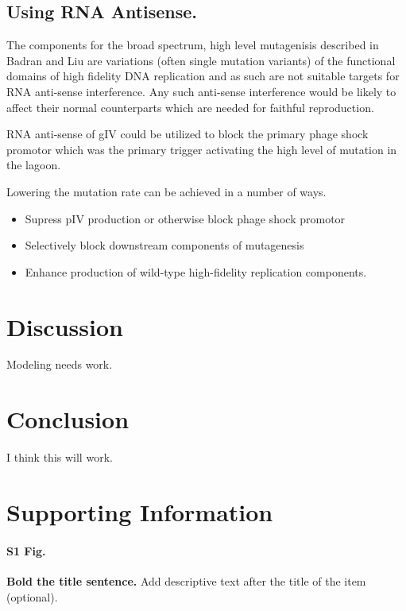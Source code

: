 \documentclass[10pt,letterpaper]{article}
\begin{document}
\subsection*{Using RNA Antisense.}

The components for the broad spectrum, high level mutagenisis described in Badran and Liu\cite{mutation} are variations (often single mutation variants) of the functional domains of high fidelity DNA replication and as such are not suitable targets for RNA anti-sense interference. Any such anti-sense interference would be likely to affect their normal counterparts which are needed for faithful reproduction.

RNA anti-sense of gIV could be utilized to block the primary phage shock promotor which was the primary trigger activating the high level of mutation in the lagoon.

Lowering the mutation rate can be achieved in a number of ways.

\begin{itemize}
	\item Supress pIV production or otherwise block phage shock promotor
	\item Selectively block downstream components of mutagenesis
	\item Enhance production of wild-type high-fidelity replication components.
\end{itemize}

\section*{Discussion}
Modeling needs work.

\section*{Conclusion}

I think this will work.

\section*{Supporting Information}

\paragraph*{S1 Fig.}
\label{S1_Fig}
{\bf Bold the title sentence.} Add descriptive text after the title of the item (optional).
\end{document}
